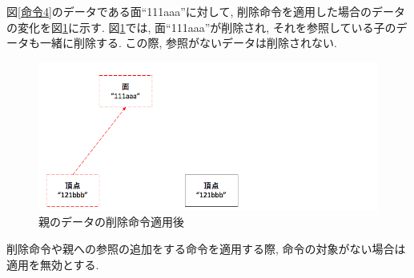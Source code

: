 図\ref{命令4}のデータである面``111aaa''に対して, 削除命令を適用した場合のデータの変化を図\ref{命令5}に示す. 図\ref{命令5}では, 面``111aaa''が削除され, それを参照している子のデータも一緒に削除する. この際, 参照がないデータは削除されない.
\begin{figure}[htbp]
  \begin{center}
    \includegraphics[scale=0.45]{images/ope5}
    \caption{親のデータの削除命令適用後}
    \label{命令5}
  \end{center}
\end{figure}
削除命令や親への参照の追加をする命令を適用する際, 命令の対象がない場合は適用を無効とする.
